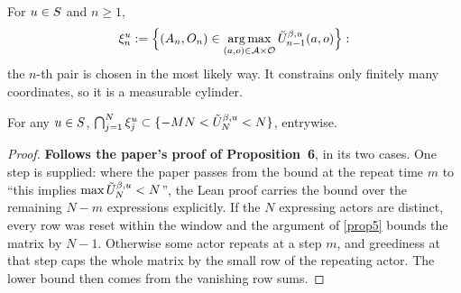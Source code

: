 \begin{definition}
  \label{aux-greedy}
  \leanok
  For $u \in S$ and $n \ge 1$,
  \[
    \xi_n^u := \Bigl\{ (A_n, O_n) \in
      \operatorname*{arg\,max}_{(a,o) \in \mathcal{A} \times \mathcal{O}}
      \tilde{U}^{\beta,u}_{n-1}(a,o) \Bigr\} :
  \]
  the $n$-th pair is chosen in the most likely way.  It constrains only finitely
  many coordinates, so it is a measurable cylinder.
\end{definition}

\begin{proposition}[Confinement]
  \label{prop6}
  \leanok
  For any $u \in S$,
  $\bigcap_{j=1}^{N} \xi_j^u \subset \{ -MN < \tilde{U}^{\beta,u}_N < N \}$, entrywise.
\end{proposition}
\begin{proof}
  \leanok
  \textbf{Follows the paper's proof of Proposition~6}, in its two cases.  One
  step is supplied: where the paper passes from the bound at the repeat time
  $m$ to ``this implies $\max \tilde{U}^{\beta,u}_N < N$'', the Lean proof carries the
  bound over the remaining $N - m$ expressions explicitly.  If the $N$
  expressing actors are distinct, every row was reset within the window and the
  argument of \ref{prop5} bounds the matrix by $N-1$.  Otherwise some actor
  repeats at a step $m$, and greediness at that step caps the whole matrix by
  the small row of the repeating actor.  The lower bound then comes from the
  vanishing row sums.
\end{proof}

